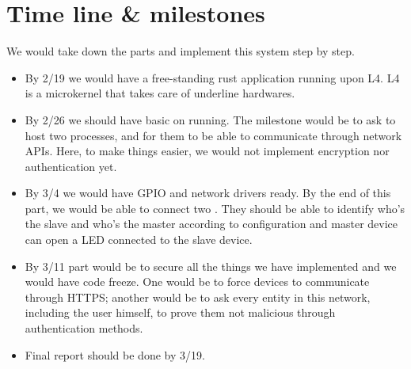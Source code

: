 \section{Time line \& milestones}

We would take down the parts and implement this system step by step.

\begin{itemize}
    \item By 2/19 we would have a free-standing rust application running upon L4\cite{L4}. L4 is a microkernel that takes care of underline hardwares.

    \item By 2/26 we should have basic \ritos on \rpi running. 
    The milestone would be to ask \ritos to host two processes, and for them to be able to communicate through network APIs.
    Here, to make things easier, we would not implement encryption nor authentication yet.

    \item By 3/4 we would have GPIO and network drivers ready.
    By the end of this part, we would be able to connect two \rpis. 
    They should be able to identify who's the slave and who's the master according to configuration and master device can open a LED  connected to the slave device.
    
    \item By 3/11 part would be to secure all the things we have implemented and we would have code freeze.
    One would be to force devices to communicate through HTTPS; another would be to ask every entity in this network, including the user himself, to prove them not malicious through authentication methods.
    
    \item Final report should be done by 3/19.

\end{itemize}
